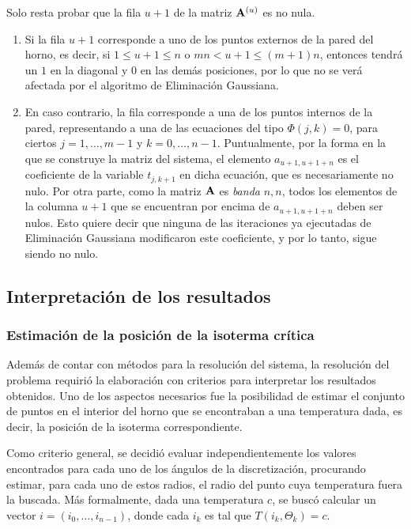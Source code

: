 \begin{enumerate}[label=(\roman*)]
            Solo resta probar que la fila $u+1$ de la matriz $\mathbf{A}^{(u)}$ es no nula.
            \begin{enumerate}[label=(\alph*)]
                \item Si la fila $u + 1$ corresponde a uno de los puntos externos de la pared del horno, es decir, si $1 \leq u+1 \leq n$ o $mn < u + 1 \leq (m+1)n$, entonces tendrá un $1$ en la diagonal y $0$ en las demás posiciones, por lo que no se verá afectada por el algoritmo de Eliminación Gaussiana.
                \item En caso contrario, la fila corresponde a una de los puntos internos de la pared, representando a una de las ecuaciones del tipo $\Phi(j,k) = 0$, para ciertos $j = 1, \dots, m - 1$ y $k = 0, \dots, n - 1$. Puntualmente, por la forma en la que se construye la matriz del sistema, el elemento $a_{u+1,u+1+n}$ es el coeficiente de la variable $t_{j,k+1}$ en dicha ecuación, que es necesariamente no nulo. Por otra parte, como la matriz $\mathbf{A}$ es \emph{banda} $n, n$, todos los elementos de la columna $u+1$ que se encuentran por encima de $a_{u+1,u+1+n}$ deben ser nulos. Esto quiere decir que ninguna de las iteraciones ya ejecutadas de Eliminación Gaussiana modificaron este coeficiente, y por lo tanto, sigue siendo no nulo.
            \end{enumerate}
        \end{enumerate}

    \subsection{Interpretación de los resultados}

        \subsubsection{Estimación de la posición de la isoterma crítica}

            Además de contar con métodos para la resolución del sistema, la resolución del problema requirió la elaboración con criterios para interpretar los resultados obtenidos. Uno de los aspectos necesarios fue la posibilidad de estimar el conjunto de puntos en el interior del horno que se encontraban a una temperatura dada, es decir, la posición de la isoterma correspondiente.

            Como criterio general, se decidió evaluar independientemente los valores encontrados para cada uno de los ángulos de la discretización, procurando estimar, para cada uno de estos radios, el radio del punto cuya temperatura fuera la buscada. Más formalmente, dada una temperatura $c$, se buscó calcular un vector $i = (i_0, \dots, i_{n-1})$, donde cada $i_k$ es tal que $T(i_k, \Theta_k) = c$.

